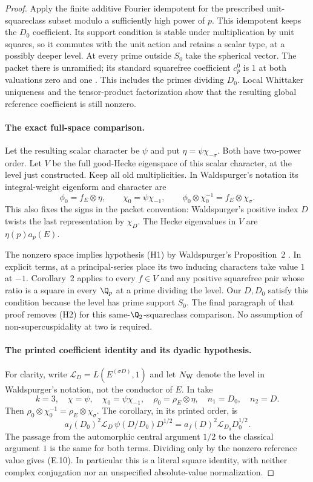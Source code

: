 \begin{proof}
Apply the finite additive Fourier idempotent for the prescribed
unit-squareclass subset modulo a sufficiently high power of $p$.
This idempotent keeps the $D_0$ coefficient. Its support condition
is stable under multiplication by unit squares, so it commutes
with the unit action and retains a scalar type, at a possibly
deeper level. At every prime outside $S_0$ take the spherical vector.
The packet there is unramified; its standard squarefree coefficient
$c_p^0$ is $1$ at both valuations zero and one
\cite[Section~I.3, pp.~377--378]{waldspurger}.
This includes the primes dividing $D_0$. Local Whittaker uniqueness
and the tensor-product factorization show that the resulting
global reference coefficient is still nonzero.

\paragraph{The exact full-space comparison.}
Let the resulting scalar character be $\psi$ and put
$\eta=\psi\chi_{-\sigma}$. Both have two-power order.
Let $V$ be the full good-Hecke eigenspace of this scalar character,
at the level just constructed. Keep all old multiplicities. In
Waldspurger's notation its integral-weight eigenform and character are
\[
 \phi_0=f_E\otimes\eta,\qquad
 \chi_0=\psi\chi_{-1},\qquad
 \phi_0\otimes\chi_0^{-1}=f_E\otimes\chi_\sigma .
\]
This also fixes the signs in the packet convention: Waldspurger's
positive index $D$ twists the last representation by $\chi_D$.
The Hecke eigenvalues in $V$ are $\eta(p)a_p(E)$.

The nonzero space implies hypothesis (H1) by Waldspurger's
Proposition~2 \cite[Section~I.2, p.~377]{waldspurger}. In explicit terms, at a principal-series
place its two inducing characters take value $1$ at $-1$.
Corollary~2 \cite[pp.~483--484]{waldspurger} applies to every $f\in V$ and any
positive squarefree pair whose ratio is a square in every
$\Q_p$ at a prime dividing the level. Our $D,D_0$ satisfy
this condition because the level has prime support $S_0$.
The final paragraph of that proof removes (H2) for this
same-$\Q_2$-squareclass comparison. No assumption of
non-supercuspidality at two is required.

\paragraph{The printed coefficient identity and its dyadic hypothesis.}
For clarity, write $\mathcal L_D=L(E^{(\sigma D)},1)$ and let
$N_{\rm W}$ denote the level in Waldspurger's notation, not the
conductor of $E$. In \cite[Corollary~2, pp.~483--484]{waldspurger}
take
\[
 k=3,\quad \chi=\psi,\quad \chi_0=\psi\chi_{-1},\quad
 \rho_0=\rho_E\otimes\eta,\quad n_1=D_0,\quad n_2=D.
\]
Then $\rho_0\otimes\chi_0^{-1}=\rho_E\otimes\chi_\sigma$.
The corollary, in its printed order, is
\[
 a_f(D_0)^2\mathcal L_D\,\psi(D/D_0)D^{1/2}
   =a_f(D)^2\mathcal L_{D_0}D_0^{1/2}.
\]
The passage from the automorphic central argument $1/2$ to the
classical argument $1$ is the same for both terms. Dividing only
by the nonzero reference value gives (E.10). In particular this
is a literal square identity, with neither complex conjugation
nor an unspecified absolute-value normalization.


\end{proof}
